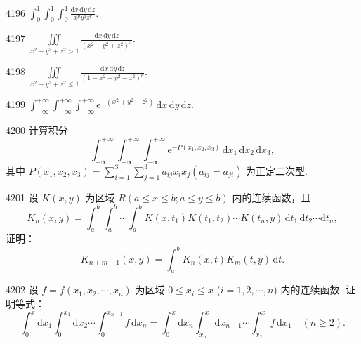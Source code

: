 
\begin{prob}[S]{4196}
$\displaystyle \int_0^1 \int_0^1 \int_0^1 \frac{\mathrm{d}x\,\mathrm{d}y\,\mathrm{d}z}{x^p y^q z^r}$.
\end{prob}

\begin{prob}[S]{4197}
$\displaystyle \iiint\limits_{x^2+y^2+z^2>1} \frac{\mathrm{d}x\,\mathrm{d}y\,\mathrm{d}z}{(x^2+y^2+z^2)^3}$.
\end{prob}

\begin{prob}[S]{4198}
$\displaystyle \iiint\limits_{x^2+y^2+z^2\leqslant 1} \frac{\mathrm{d}x\,\mathrm{d}y\,\mathrm{d}z}{(1-x^2-y^2-z^2)^p}$.
\end{prob}

\begin{prob}[S]{4199}
$\displaystyle \int_{-\infty}^{+\infty} \int_{-\infty}^{+\infty} \int_{-\infty}^{+\infty} \mathrm{e}^{-(x^2+y^2+z^2)}\,\mathrm{d}x\,\mathrm{d}y\,\mathrm{d}z$.
\end{prob}

\begin{prob}[M]{4200}
计算积分
\[
\int_{-\infty}^{+\infty} \int_{-\infty}^{+\infty} \int_{-\infty}^{+\infty} \mathrm{e}^{-P(x_1, x_2, x_3)}\,\mathrm{d}x_1\,\mathrm{d}x_2\,\mathrm{d}x_3,
\]
其中 $P(x_1, x_2, x_3) = \sum_{i=1}^3 \sum_{j=1}^3 a_{ij} x_i x_j (a_{ij}=a_{ji})$ 为正定二次型.
\end{prob}


\begin{prob}[M]{4201}
设 $K(x, y)$ 为区域 $R(a \leqslant x \leqslant b; a \leqslant y \leqslant b)$ 内的连续函数，且
\[
K_n(x, y) = \int_a^b \int_a^b \cdots \int_a^b K(x, t_1) K(t_1, t_2) \cdots K(t_n, y)\,\mathrm{d}t_1\,\mathrm{d}t_2 \cdots \mathrm{d}t_n,
\]
证明：
\[
K_{n+m+1}(x, y) = \int_a^b K_n(x, t) K_m(t, y)\,\mathrm{d}t.
\]
\end{prob}

\begin{prob}[M]{4202}
设 $f = f(x_1, x_2, \cdots, x_n)$ 为区域 $0 \leqslant x_i \leqslant x$ ($i = 1, 2, \cdots, n$) 内的连续函数. 证明等式：
\[
\int_0^x \mathrm{d}x_1 \int_0^{x_1} \mathrm{d}x_2 \cdots \int_0^{x_{n-1}} f\,\mathrm{d}x_n = \int_0^x \mathrm{d}x_n \int_{x_n}^x \mathrm{d}x_{n-1} \cdots \int_{x_2}^x f\,\mathrm{d}x_1 \quad (n \geqslant 2).
\]
\end{prob}

